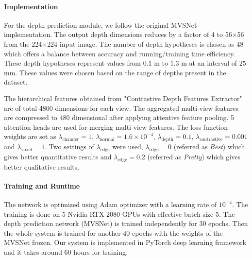 \paragraph{Implementation}\vspace{-4mm}
For the depth prediction module, we follow the original MVSNet~\cite{yao2018mvsnet} implementation.
The output depth dimensions reduces by a factor of 4 to 56$\times$56 from the 224$\times$224 input image.
The number of depth hypotheses is chosen as 48 which offers a balance between accuracy and running/training time efficiency.
These depth hypotheses represent values from $0.1$ m to $1.3$ m at an interval of $25$ mm.
These values were chosen based on the range of depths present in the dataset.

The hierarchical features obtained from "Contrastive Depth Features Extractor" are of total 4800 dimensions for each view.
The aggregated multi-view features are compressed to 480 dimensional after applying attentive feature pooling.
5 attention heads are used for merging multi-view features.
The loss function weights are set as $\lambda_{\text{chamfer}}=1$, $\lambda_{\text{normal}}=1.6\times10^{-4}$, $\lambda_{\text{depth}}=0.1$, $\lambda_{\text{contrastive}}=0.001$ and $\lambda_{\text{voxel}}=1$.
Two settings of $\lambda_{\text{edge}}$ were used, $\lambda_{\text{edge}}=0$ (referred as \emph{Best}) which gives better quantitative results and $\lambda_{\text{edge}}=0.2$ (referred as \emph{Pretty}) which gives better qualitative results.



\paragraph{Training and Runtime}\vspace{-4mm}
The network is optimized using Adam optimizer with a learning rate of $10^{-4}$.
The training is done on 5 Nvidia RTX-2080 GPUs with effective batch size 5.
The depth prediction network (MVSNet) is trained independently for 30 epochs.
Then the whole system is trained for another 40 epochs with the weights of the MVSNet frozen.
Our system is implemented in PyTorch deep learning framework and it takes around 60 hours for training.

